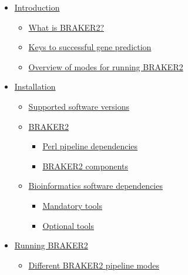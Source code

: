 \documentclass[]{article}
\providecommand{\tightlist}{%
  \setlength{\itemsep}{0pt}\setlength{\parskip}{0pt}}
\begin{document}
\begin{itemize}
\tightlist
\item
  \protect\hyperlink{introduction}{Introduction}

  \begin{itemize}
  \tightlist
  \item
    \protect\hyperlink{what-is-braker2}{What is BRAKER2?}
  \item
    \protect\hyperlink{keys-to-successful-gene-prediction}{Keys to
    successful gene prediction}
  \item
    \protect\hyperlink{overview-of-modes-for-running-braker2}{Overview
    of modes for running BRAKER2}
  \end{itemize}
\item
  \protect\hyperlink{installation}{Installation}

  \begin{itemize}
  \tightlist
  \item
    \protect\hyperlink{supported-software-versions}{Supported software
    versions}
  \item
    \protect\hyperlink{braker2}{BRAKER2}

    \begin{itemize}
    \tightlist
    \item
      \protect\hyperlink{perl-pipeline-dependencies}{Perl pipeline
      dependencies}
    \item
      \protect\hyperlink{Executability}{BRAKER2 components}
    \end{itemize}
  \item
    \protect\hyperlink{bioinformatics-software-dependencies}{Bioinformatics
    software dependencies}

    \begin{itemize}
    \tightlist
    \item
      \protect\hyperlink{mandatory-tools}{Mandatory tools}
    \item
      \protect\hyperlink{optional-tools}{Optional tools}
    \end{itemize}
  \end{itemize}
\item
  \protect\hyperlink{running-braker2}{Running BRAKER2}

  \begin{itemize}
  \tightlist
  \item
    \protect\hyperlink{different-braker2-pipeline-modes}{Different
    BRAKER2 pipeline modes}


\end{itemize}
\end{itemize}
\end{document}
